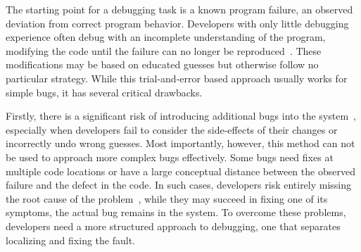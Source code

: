 
The starting point for a debugging task is a known program failure, an observed deviation from correct program behavior.
Developers with only little debugging experience often debug with an incomplete understanding of the program, modifying the code until the failure can no longer be reproduced~\cite{gugerty86:comprehension_differences_in_debugging}.
These modifications may be based on educated guesses but otherwise follow no particular strategy.
While this trial-and-error based approach usually works for simple bugs, it has several critical drawbacks.

Firstly, there is a significant risk of introducing additional bugs into the system~\cite{gugerty86:comprehension_differences_in_debugging,yin11:how_do_fixes_become}, especially when developers fail to consider the side-effects of their changes or incorrectly undo wrong guesses.
Most importantly, however, this method can not be used to approach more complex bugs effectively.
Some bugs need fixes at multiple code locations or have a large conceptual distance between the observed failure and the defect in the code.
In such cases, developers risk entirely missing the root cause of the problem~\cite{gu10:has_the_bug_really},
\ie while they may succeed in fixing one of its symptoms, the actual bug remains in the system.
To overcome these problems, developers need a more structured approach to debugging, one that separates localizing and fixing the fault.

